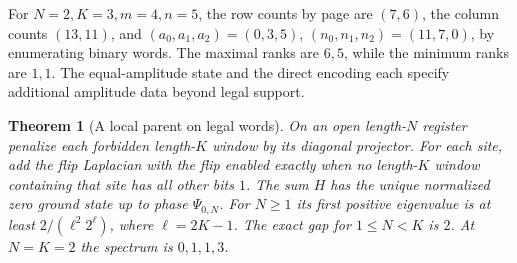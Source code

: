\documentclass[11pt,reqno]{amsart}
\newtheorem{theorem}{Theorem}[section]
\theoremstyle{definition}
\theoremstyle{remark}
\numberwithin{equation}{section}
\begin{document}
For \(N=2,K=3,m=4,n=5\), the row counts by page are \((7,6)\),
the column counts \((13,11)\), and \((a_0,a_1,a_2)=(0,3,5)\),
\((n_0,n_1,n_2)=(11,7,0)\), by enumerating binary words.
The maximal ranks are \(6,5\), while the minimum ranks
are \(1,1\). The equal-amplitude state and the direct encoding
each specify additional amplitude data beyond legal support.

\begin{theorem}[A local parent on legal words]\label{m9:parent}
On an open length-\(N\) register penalize each forbidden
length-\(K\) window by its diagonal projector. For each site,
add the flip Laplacian with the flip enabled exactly when no
length-\(K\) window containing that site has all other bits \(1\).
The sum \(H\) has the unique normalized zero ground state
up to phase \(\Psi_{0,N}\). For \(N\ge1\) its first positive
eigenvalue is at least \(2/(\ell^2 2^\ell)\), where
\(\ell=2K-1\). The exact gap for \(1\le N<K\) is \(2\).
At \(N=K=2\) the spectrum is \(0,1,1,3\).
\end{theorem}
\end{document}
